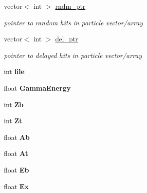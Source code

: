 \begin{DoxyCompactItemize}
\mbox{\label{classg__clx_a725e1e1ac561608e1c5655c98bd54e5c}} 
vector$<$ int $>$ \hyperlink{classg__clx_a725e1e1ac561608e1c5655c98bd54e5c}{rndm\+\_\+ptr}
\begin{DoxyCompactList}\small\item\em pointer to random hits in particle vector/array \end{DoxyCompactList}\item 
\mbox{\label{classg__clx_a8d3d0ba6762602362d74916430e8786c}} 
vector$<$ int $>$ \hyperlink{classg__clx_a8d3d0ba6762602362d74916430e8786c}{del\+\_\+ptr}
\begin{DoxyCompactList}\small\item\em pointer to delayed hits in particle vector/array \end{DoxyCompactList}\item 
\mbox{\label{classg__clx_a4b7f5bc375e032d31bebb6ba34cb328f}} 
int {\bfseries file}
\item 
\mbox{\label{classg__clx_aade220d336f2c91d09b4da5a14138436}} 
float {\bfseries Gamma\+Energy}
\item 
\mbox{\label{classg__clx_a10f3a51541a437abeafdde5e4d919296}} 
int {\bfseries Zb}
\item 
\mbox{\label{classg__clx_af3a63ef9a4e0e92e6646ec8c9e86cd2d}} 
int {\bfseries Zt}
\item 
\mbox{\label{classg__clx_a9806f6d9aa4ecd6daeccd1f8184bbb5e}} 
float {\bfseries Ab}
\item 
\mbox{\label{classg__clx_a0a85cb0adca7a54ed29ebda550b36dcc}} 
float {\bfseries At}
\item 
\mbox{\label{classg__clx_adacfaa00cabbde7095f23a1cacab7510}} 
float {\bfseries Eb}
\item 
\mbox{\label{classg__clx_a1f2096a705a986c48af8540f6eb1b835}} 
float {\bfseries Ex}
\item 
\mbox{\label{classg__clx_ada5b4790b6f1970cd350444564604e2f}} 

\end{DoxyCompactItemize}
